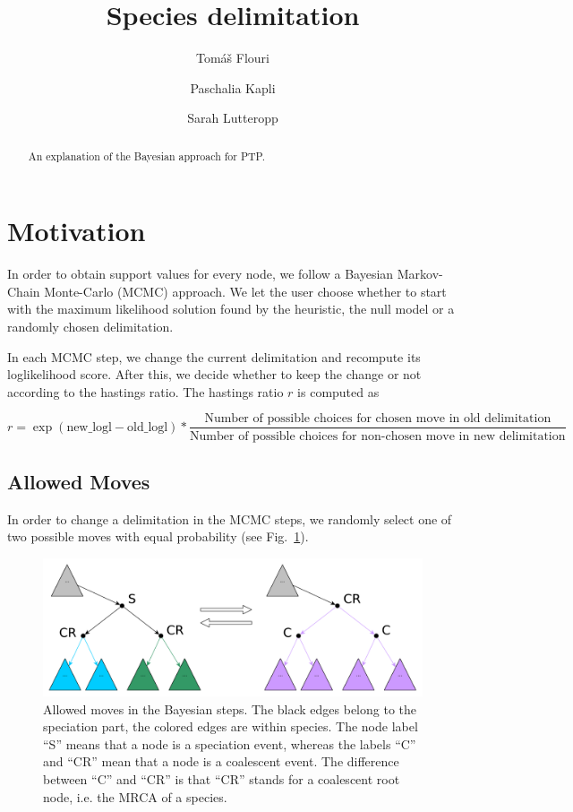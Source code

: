 \documentclass{llncs}
\begin{document}
\title{Species delimitation}


\author{Tom\'{a}\v{s} Flouri \and Paschalia Kapli \and Sarah Lutteropp}

\maketitle

\begin{abstract}
An explanation of the Bayesian approach for PTP.\@
\end{abstract}

\section{Motivation}

In order to obtain support values for every node, we follow a Bayesian Markov-Chain Monte-Carlo (MCMC) approach. We let the user choose whether to start with the maximum likelihood solution found by the heuristic, the null model or a randomly chosen delimitation.

In each MCMC step, we change the current delimitation and recompute its loglikelihood score. After this, we decide whether to keep the change or not according to the hastings ratio. The hastings ratio $r$ is computed as

$$r = \exp(\text{new\_logl} - \text{old\_logl}) * \frac{\text{Number of possible choices for chosen move in old delimitation}}{\text{Number of possible choices for non-chosen move in new delimitation}}$$

\subsection{Allowed Moves}

In order to change a delimitation in the MCMC steps, we randomly select one of two possible moves with equal probability (see Fig.~\ref{fig:moves}).

\begin{figure}[h!]
\centering
\includegraphics[scale=0.3]{images/moves.pdf}
\caption{Allowed moves in the Bayesian steps. The black edges belong to the speciation part, the colored edges are within species. The node label ``S'' means that a node is a speciation event, whereas the labels ``C'' and ``CR'' mean that a node is a coalescent event. The difference between ``C'' and ``CR'' is that ``CR'' stands for a coalescent root node, i.e. the MRCA of a species.}
\label{fig:moves}
\end{figure}
\end{document}
